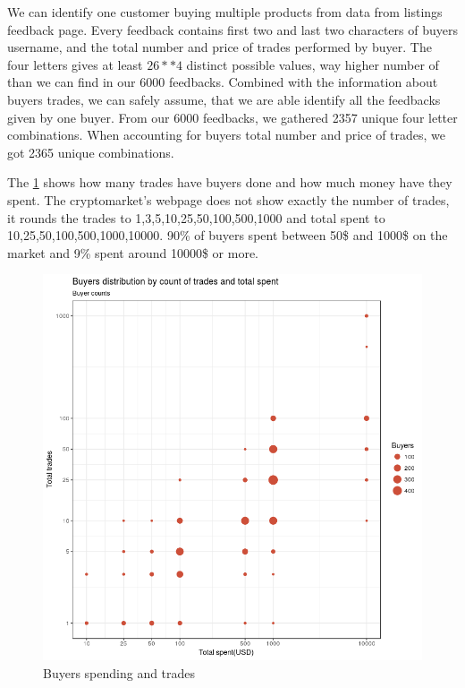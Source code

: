 \documentclass[
  digital, %
  table,   %
  lof,     %
  lot,     %
  oneside
]{fithesis3}
\begin{document}
We can identify one customer buying multiple products from data from listings feedback page.
Every feedback contains first two and last two characters of buyers username,
and the total number and price of trades performed by buyer.
The four letters gives at least $26**4$ distinct possible values, way higher number of 
than we can find in our 6000 feedbacks. Combined with the information
about buyers trades, we can safely assume, that we are able identify
all the feedbacks given by one buyer.
From our 6000 feedbacks, we gathered 2357 unique four letter combinations.
When accounting for buyers total number and price of trades, we got 2365 unique combinations.

The \ref{buytrad} shows how many trades have buyers done and how much money have they spent.
The cryptomarket's webpage does not show exactly the number of trades, it rounds the trades
to 1,3,5,10,25,50,100,500,1000 and total spent to 10,25,50,100,500,1000,10000.
90\% of buyers spent between 50\$ and 1000\$ on the market and 9\% spent around 10000\$ or more.

\begin{figure}[!htb]
    \centering
    \includegraphics[scale=0.4]{buytrad}
    \caption{Buyers spending and trades}
    \label{buytrad}
\end{figure}
\end{document}
